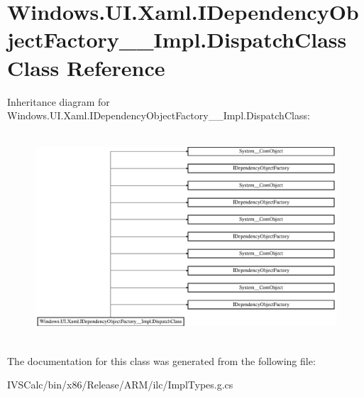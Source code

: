 \hypertarget{class_windows_1_1_u_i_1_1_xaml_1_1_i_dependency_object_factory_____impl_1_1_dispatch_class}{}\section{Windows.\+U\+I.\+Xaml.\+I\+Dependency\+Object\+Factory\+\_\+\+\_\+\+Impl.\+Dispatch\+Class Class Reference}
\label{class_windows_1_1_u_i_1_1_xaml_1_1_i_dependency_object_factory_____impl_1_1_dispatch_class}
Inheritance diagram for Windows.\+U\+I.\+Xaml.\+I\+Dependency\+Object\+Factory\+\_\+\+\_\+\+Impl.\+Dispatch\+Class\+:\begin{figure}[H]
\begin{center}
\leavevmode
\includegraphics[height=7.758186cm]{class_windows_1_1_u_i_1_1_xaml_1_1_i_dependency_object_factory_____impl_1_1_dispatch_class}
\end{center}
\end{figure}


The documentation for this class was generated from the following file\+:\begin{DoxyCompactItemize}
\item 
I\+V\+S\+Calc/bin/x86/\+Release/\+A\+R\+M/ilc/Impl\+Types.\+g.\+cs\end{DoxyCompactItemize}

